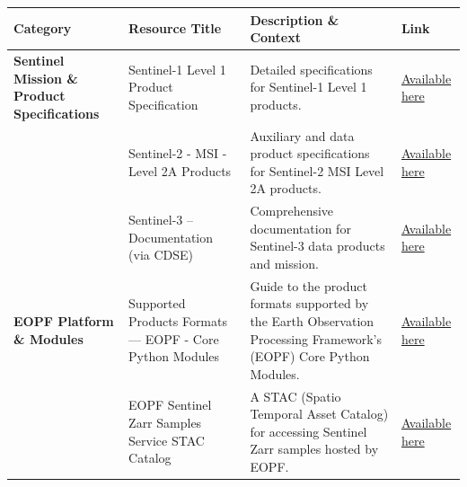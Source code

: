 \documentclass[
  letterpaper,
  DIV=11,
  numbers=noendperiod]{scrreprt}
\begin{document}
\begin{longtable}[]{@{}
  >{\raggedright\arraybackslash}p{}
  >{\raggedright\arraybackslash}p{}
  >{\raggedright\arraybackslash}p{}
  >{\raggedright\arraybackslash}p{}@{}}
\toprule\noalign{}
\begin{minipage}[b]{\linewidth}\raggedright
Category
\end{minipage} & \begin{minipage}[b]{\linewidth}\raggedright
Resource Title
\end{minipage} & \begin{minipage}[b]{\linewidth}\raggedright
Description \& Context
\end{minipage} & \begin{minipage}[b]{\linewidth}\raggedright
Link
\end{minipage} \\
\midrule\noalign{}
\endhead
\bottomrule\noalign{}
\endlastfoot
\textbf{Sentinel Mission \& Product Specifications} & Sentinel-1 Level 1
Product Specification & Detailed specifications for Sentinel-1 Level 1
products. &
\href{https://s1.pages.eopf.copernicus.eu/s1-l12-rp/main/pfs/level_1_product_specification.html}{Available
here} \\
& Sentinel-2 - MSI - Level 2A Products & Auxiliary and data product
specifications for Sentinel-2 MSI Level 2A products. &
\href{https://s2.pages.eopf.copernicus.eu/pdfs-adfs/MSI/L2/PDFS_S2_MSI_L2.myst.html}{Available
here} \\
& Sentinel-3 -- Documentation (via CDSE) & Comprehensive documentation
for Sentinel-3 data products and mission. &
\href{https://documentation.dataspace.copernicus.eu/Data/SentinelMissions/Sentinel3.html}{Available
here} \\
\textbf{EOPF Platform \& Modules} & Supported Products Formats --- EOPF
- Core Python Modules & Guide to the product formats supported by the
Earth Observation Processing Framework's (EOPF) Core Python Modules. &
\href{https://cpm.pages.eopf.copernicus.eu/eopf-cpm/main/eoproduct-user-guide/supported_formats.html}{Available
here} \\
& EOPF Sentinel Zarr Samples Service STAC Catalog & A STAC (Spatio
Temporal Asset Catalog) for accessing Sentinel Zarr samples hosted by
EOPF. &
\href{https://stac.browser.user.eopf.eodc.eu/?.language=en}{Available
here} \\

\end{longtable}
\end{document}
